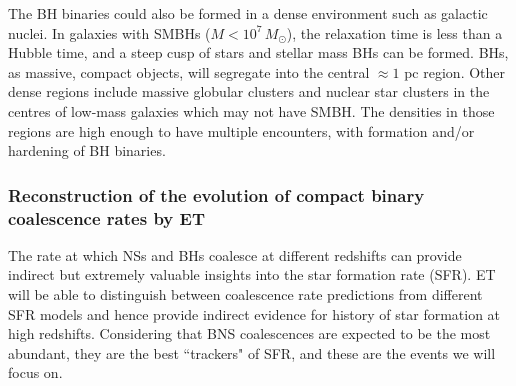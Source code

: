 The BH binaries could also be formed in a dense environment such as galactic nuclei.
In galaxies with SMBHs ($M < 10^7\, M_{\odot}$), the relaxation time is less than a Hubble
time, and a steep cusp of stars and stellar mass BHs can be formed. BHs, as massive,
compact objects, will segregate into the central $\approx 1$ pc region. Other dense regions include
massive globular clusters and nuclear star clusters in the centres of low-mass galaxies
which may not have SMBH. The densities in those regions are high enough to have multiple
encounters, with formation and/or hardening of BH binaries.

\subsubsection{Reconstruction of the evolution of compact binary 
coalescence rates by ET}

The rate at which NSs and BHs coalesce at different redshifts can 
provide indirect but extremely valuable insights into the star 
formation rate (SFR). ET will be able to distinguish between 
coalescence rate predictions from different SFR models and hence 
provide indirect evidence for history of star formation at high 
redshifts. Considering that BNS coalescences are expected to be 
the most abundant, they are the best ``trackers" of SFR, and these 
are the events we will focus on.

